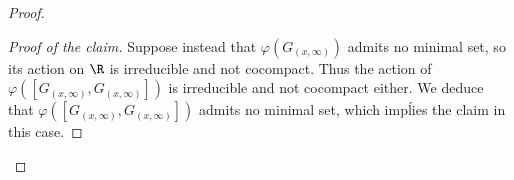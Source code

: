 \documentclass[reqno]{amsart}
\begin{document}
\begin{proof}
\begin{proof}[Proof of the claim]
Suppose instead that $\varphi(G_{(x, \infty)})$ admits no minimal set, so its action on $\R$ is irreducible and not cocompact. Thus the action of $\varphi([G_{(x, \infty)}, G_{(x, \infty)}])$ is irreducible and not cocompact either. We deduce that $\varphi([G_{(x, \infty)}, G_{(x, \infty)}])$ admits no minimal set, which impĺies the claim in this case.
%
%
%
\end{proof}


\end{proof}
\end{document}
